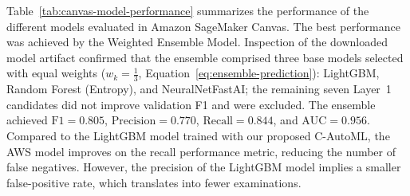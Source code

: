 \documentclass[diagnostics,article,accept,pdftex,moreauthors]{Definitions/mdpi}
\begin{document}
Table~\ref{tab:canvas-model-performance} summarizes the performance of
the different models evaluated in Amazon SageMaker Canvas. The best
performance was achieved by the Weighted Ensemble Model.
Inspection of the downloaded model artifact confirmed
  that the ensemble comprised three base models selected with equal
  weights ($w_k = \tfrac{1}{3}$, Equation~\eqref{eq:ensemble-prediction}):
  LightGBM, Random Forest (Entropy), and NeuralNetFastAI; the
  remaining seven Layer~1 candidates did not improve validation
  \ac{F1} and were excluded. The ensemble achieved
$\mathrm{F1}=0.805$, $\mathrm{Precision}=0.770$, $\mathrm{Recall}=0.844$, and
$\mathrm{AUC}=0.956$. Compared to the LightGBM model trained with
our proposed \ac{C-AutoML}, the AWS model improves on the recall
performance metric, reducing the number of false negatives. However,
the precision of the LightGBM model implies a smaller
false-positive rate, which translates into fewer examinations.


\end{document}
